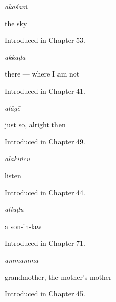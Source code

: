 \noindent\begin{minipage}[t]{\linewidth}
\raggedright
\textbf{}\enspace\emph{ākāśaṁ}\par
\small the sky\par
\footnotesize Introduced in Chapter 53.
\end{minipage}\par\medskip

\noindent\begin{minipage}[t]{\linewidth}
\raggedright
\textbf{}\enspace\emph{akkaḍa}\par
\small there — where I am not\par
\footnotesize Introduced in Chapter 41.
\end{minipage}\par\medskip

\noindent\begin{minipage}[t]{\linewidth}
\raggedright
\textbf{}\enspace\emph{alāgē}\par
\small just so, alright then\par
\footnotesize Introduced in Chapter 49.
\end{minipage}\par\medskip

\noindent\begin{minipage}[t]{\linewidth}
\raggedright
\textbf{}\enspace\emph{ālakiñcu}\par
\small listen\par
\footnotesize Introduced in Chapter 44.
\end{minipage}\par\medskip

\noindent\begin{minipage}[t]{\linewidth}
\raggedright
\textbf{}\enspace\emph{alluḍu}\par
\small a son-in-law\par
\footnotesize Introduced in Chapter 71.
\end{minipage}\par\medskip

\noindent\begin{minipage}[t]{\linewidth}
\raggedright
\textbf{}\enspace\emph{ammamma}\par
\small grandmother, the mother's mother\par
\footnotesize Introduced in Chapter 45.
\end{minipage}\par\medskip

